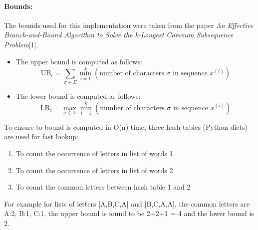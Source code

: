 \documentclass[a4paper,12pt]{article}
\begin{document}
				\paragraph{Bounds:} The bounds used for this implementation were taken from the paper \textit{An Effective Branch-and-Bound Algorithm to Solve the
k-Longest Common Subsequence Problem}[1].
				\begin{itemize}
					\item The upper bound is computed as follows:
						$$\text{UB}_c = \sum_{\sigma \in \Sigma} \min_{i=1}^k(\text{number of characters $\sigma$ in sequence $x^{(i)}$})$$
					\item The lower bound is computed as follows:
						$$\text{LB}_c = \max_{\sigma \in \Sigma} \min_{i=1}^k(\text{number of characters $\sigma$ in sequence $x^{(i)}$})$$
				\end{itemize}
				To ensure to bound is computed in O(n) time, three hash tables (Python dicts) are used for fast lookup:
				\begin{enumerate}
					\item To count the occurrence of letters in list of words 1
					\item To count the occurrence of letters in list of words 2
					\item To count the common letters between hash table 1 and 2
				\end{enumerate}
				For example for lists of letters [A,B,C,A] and [B,C,A,A], the common letters are A:2, B:1, C:1, the upper bound is found to be 2+2+1 = 4 and the lower bound is 2.
				
\end{document}
